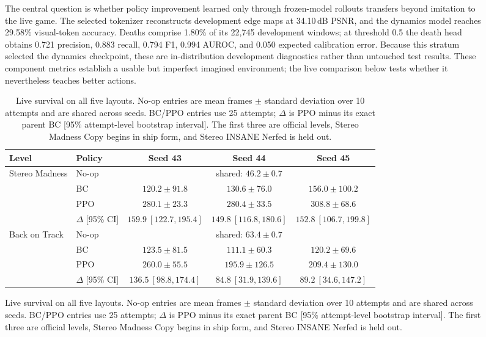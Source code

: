 \begin{figure}[!htbp]
The central question is whether policy improvement learned only through frozen-model rollouts transfers beyond imitation to the live game.
The selected tokenizer reconstructs development edge maps at 34.10\,dB PSNR, and the dynamics model reaches 29.58\% visual-token accuracy.
Deaths comprise 1.80\% of its 22,745 development windows; at threshold 0.5 the death head obtains 0.721 precision, 0.883 recall, 0.794 F1, 0.994 AUROC, and 0.050 expected calibration error.
Because this stratum selected the dynamics checkpoint, these are in-distribution development diagnostics rather than untouched test results.
These component metrics establish a usable but imperfect imagined environment; the live comparison below tests whether it nevertheless teaches better actions.

\begin{table}[H]
  \centering
  \footnotesize
  \setlength{\tabcolsep}{4pt}
  \caption{Live survival on all five layouts. No-op entries are mean frames $\pm$ standard deviation over 10 attempts and are shared across seeds. BC/PPO entries use 25 attempts; $\Delta$ is PPO minus its exact parent BC [95\% attempt-level bootstrap interval]. The first three are official levels, Stereo Madness Copy begins in ship form, and Stereo INSANE Nerfed is held out.}
  \label{tab:live-controls}
  \begin{tabular}{@{}>{\raggedright\arraybackslash}p{}lccc@{}}
    \toprule
    Level & Policy & Seed 43 & Seed 44 & Seed 45 \\
    \midrule
    Stereo Madness & No-op & \multicolumn{3}{c}{shared: $46.2\pm0.7$} \\
       & BC & $120.2\pm91.8$ & $130.6\pm76.0$ & $156.0\pm100.2$ \\
       & PPO & $\boldsymbol{280.1\pm23.3}$ & $\boldsymbol{280.4\pm33.5}$ & $\boldsymbol{308.8\pm68.6}$ \\
       & $\Delta$ [95\% CI] & $159.9\ [122.7,195.4]$ & $149.8\ [116.8,180.6]$ & $152.8\ [106.7,199.8]$ \\
    \addlinespace
    Back on Track & No-op & \multicolumn{3}{c}{shared: $63.4\pm0.7$} \\
       & BC & $123.5\pm81.5$ & $111.1\pm60.3$ & $120.2\pm69.6$ \\
       & PPO & $\boldsymbol{260.0\pm55.5}$ & $\boldsymbol{195.9\pm126.5}$ & $\boldsymbol{209.4\pm130.0}$ \\
       & $\Delta$ [95\% CI] & $136.5\ [98.8,174.4]$ & $84.8\ [31.9,139.6]$ & $89.2\ [34.6,147.2]$ \\

\end{tabular}
\end{table}
\end{figure}
